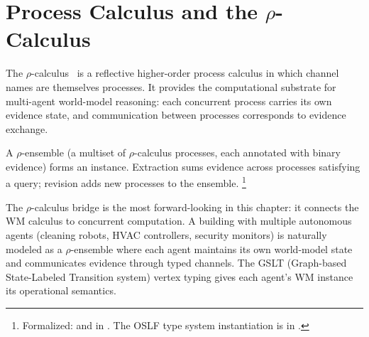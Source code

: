 \documentclass[11pt,openany]{report}
\begin{document}
\section{Process Calculus and the \texorpdfstring{$\rho$}{rho}-Calculus}
\label{sec:bridge-rho}

The $\rho$-calculus~\cite{meredith2026ccc} is a reflective
higher-order process calculus in which channel names are themselves
processes.  It provides the computational substrate for
multi-agent world-model reasoning: each concurrent process carries
its own evidence state, and communication between processes
corresponds to evidence exchange.

\begin{theorem}
\label{thm:rho-wm}
A $\rho$-ensemble (a multiset of $\rho$-calculus processes,
each annotated with binary evidence) forms an
 instance.  Extraction sums evidence
across processes satisfying a query; revision adds new processes
to the ensemble.%
\footnote{Formalized:
 and 
in .
The OSLF type system instantiation is in
.}
\end{theorem}

\noindent
The $\rho$-calculus bridge is the most forward-looking in this
chapter: it connects the WM calculus to concurrent computation.
A building with multiple autonomous agents (cleaning robots,
HVAC controllers, security monitors) is naturally modeled as a
$\rho$-ensemble where each agent maintains its own world-model
state and communicates evidence through typed channels.  The
GSLT (Graph-based State-Labeled Transition system) vertex typing
gives each agent's WM instance its operational semantics.



\end{document}
